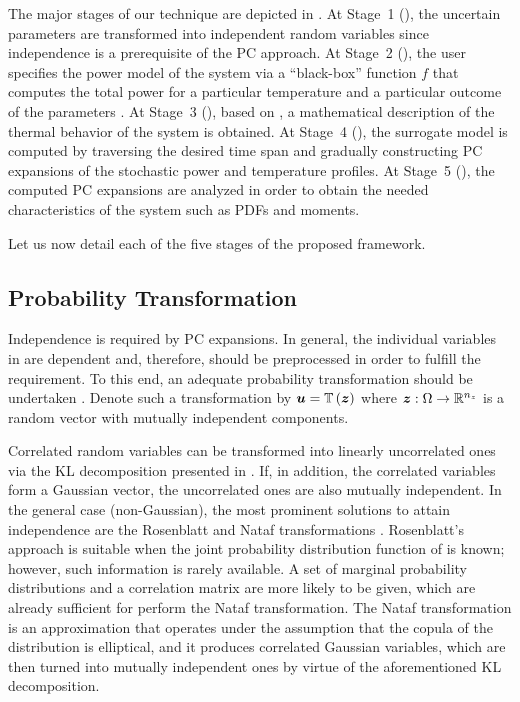 The major stages of our technique are depicted in . At
Stage~1 (), the uncertain parameters \vu
are transformed into independent random variables \vz since independence is a
prerequisite of the \ac{PC} approach. At Stage~2 (),
the user specifies the power model of the system via a ``black-box'' function
$f$ that computes the total power \vp for a particular temperature \vq and a
particular outcome of the parameters \vu. At Stage~3
(), based on , a
mathematical description of the thermal behavior of the system is obtained. At
Stage~4 (), the surrogate model is computed by
traversing the desired time span and gradually constructing \ac{PC} expansions
of the stochastic power and temperature profiles. At Stage~5
(), the computed \ac{PC} expansions are analyzed in
order to obtain the needed characteristics of the system such as \acp{PDF} and
moments.

Let us now detail each of the five stages of the proposed framework.

\subsection{Probability Transformation}

Independence is required by \ac{PC} expansions. In general, the \nu individual
variables in \vu are dependent and, therefore, should be preprocessed in order
to fulfill the requirement. To this end, an adequate probability transformation
should be undertaken \cite{eldred2008}. Denote such a transformation by $\boldsymbol{u} =
\mathbb{T}\left(\boldsymbol{z}\right)$ where $\boldsymbol{z}: \Omega \to \mathbb{R}^{n_{z}}$ is a random vector with \nz
mutually independent components.

Correlated random variables can be transformed into linearly uncorrelated ones
via the \ac{KL} decomposition presented in .
If, in addition, the correlated variables form a Gaussian vector, the
uncorrelated ones are also mutually independent. In the general case
(non-Gaussian), the most prominent solutions to attain independence are the
Rosenblatt \cite{rosenblatt1952} and Nataf transformations \cite{li2008}.
Rosenblatt's approach is suitable when the joint probability distribution
function of \vu is known; however, such information is rarely available. A set
of marginal probability distributions and a correlation matrix are more likely
to be given, which are already sufficient for perform the Nataf transformation.
The Nataf transformation is an approximation that operates under the assumption
that the copula of the distribution is elliptical, and it produces correlated
Gaussian variables, which are then turned into mutually independent ones by
virtue of the aforementioned \ac{KL} decomposition.

